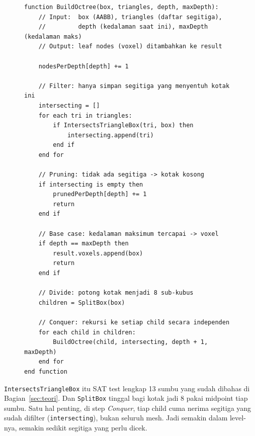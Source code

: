 \documentclass[11pt,a4paper]{article}
\begin{document}
\begin{figure}[H]
\begin{lstlisting}[language={},morekeywords={function,for,each,in,if,then,return,end},
    title={\textbf{BuildOctree}, Rekursi Divide and Conquer},
    label={alg:buildoctree}]
function BuildOctree(box, triangles, depth, maxDepth):
    // Input:  box (AABB), triangles (daftar segitiga),
    //         depth (kedalaman saat ini), maxDepth (kedalaman maks)
    // Output: leaf nodes (voxel) ditambahkan ke result

    nodesPerDepth[depth] += 1

    // Filter: hanya simpan segitiga yang menyentuh kotak ini
    intersecting = []
    for each tri in triangles:
        if IntersectsTriangleBox(tri, box) then
            intersecting.append(tri)
        end if
    end for

    // Pruning: tidak ada segitiga -> kotak kosong
    if intersecting is empty then
        prunedPerDepth[depth] += 1
        return
    end if

    // Base case: kedalaman maksimum tercapai -> voxel
    if depth == maxDepth then
        result.voxels.append(box)
        return
    end if

    // Divide: potong kotak menjadi 8 sub-kubus
    children = SplitBox(box)

    // Conquer: rekursi ke setiap child secara independen
    for each child in children:
        BuildOctree(child, intersecting, depth + 1, maxDepth)
    end for
end function
\end{lstlisting}
\end{figure}

\texttt{IntersectsTriangleBox} itu SAT test lengkap 13 sumbu yang
sudah dibahas di Bagian~\ref{sec:teori}. Dan \texttt{SplitBox} tinggal bagi kotak jadi 8
pakai midpoint tiap sumbu. Satu hal penting, di step \textit{Conquer}, tiap child cuma
nerima segitiga yang sudah difilter (\texttt{intersecting}), bukan seluruh mesh. Jadi semakin
dalam level-nya, semakin sedikit segitiga yang perlu dicek.
\end{document}
